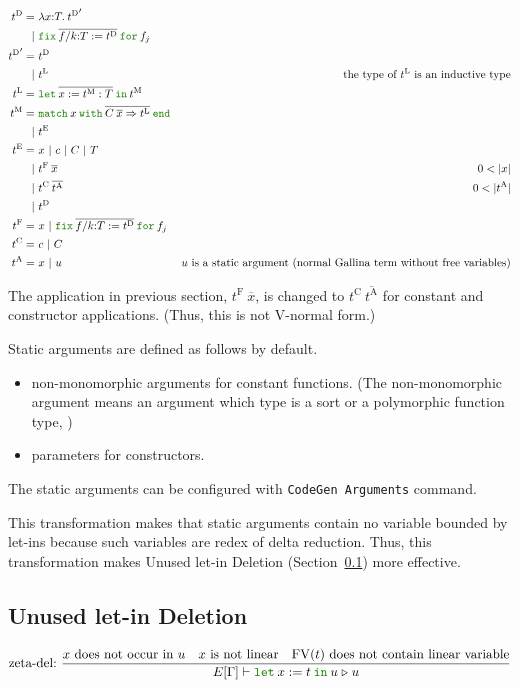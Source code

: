 \documentclass[a4paper,fleqn]{article}
\def\gallina{\textrm{Gallina}}
\newcommand{\kwlet}{\mbox{\color{mygreen}\ttfamily let}}
\newcommand{\kwin}{\mbox{\color{mygreen}\ttfamily in}}
\newcommand{\kwmatch}{\mbox{\color{mygreen}\ttfamily match}}
\newcommand{\kwwith}{\mbox{\color{mygreen}\ttfamily with}}
\newcommand{\kwend}{\mbox{\color{mygreen}\ttfamily end}}
\newcommand{\kwfix}{\mbox{\color{mygreen}\ttfamily fix}}
\newcommand{\kwfor}{\mbox{\color{mygreen}\ttfamily for}}
\newcommand{\lamT}[3]{\lambda #1\mathord{:}#2.\:#3}
\newcommand{\letin}[3]{\kwlet\:#1:=#2\:\kwin\:#3}
\newcommand{\letinM}[3]{\kwlet\:\rep{#1:=#2}\:\kwin\:#3}
\newcommand{\omatch}[2]{\kwmatch\:#1\:\kwwith\:{#2}\:\kwend}
\newcommand{\ofix}[2]{\kwfix\:{#1}\:\kwfor\:{#2}}
\DeclareMathOperator{\FV}{FV}
\newcommand{\tD}{{t^\mathrm{D}}}
\newcommand{\tE}{{t^\mathrm{E}}}
\newcommand{\tL}{{t^\mathrm{L}}}
\newcommand{\tM}{{t^\mathrm{M}}}
\newcommand{\tF}{{t^\mathrm{F}}}
\newcommand{\tC}{{t^\mathrm{C}}}
\newcommand{\tA}{{t^\mathrm{A}}}
\newcommand{\secref}[1]{Section~\ref{#1}}
\newcommand{\reltri}{\mathrel{\triangleright}}
\newcommand{\rep}[1]{\overline{#1}}
\begin{document}
\begin{align*}
  \tD =&\ \lamT{x}{T}{\tD'} \\
      |&\ \ofix{\overline{f/k{:}T:=\tD}}{f_j} \\
  \tD' =&\ \tD \\
       |&\ \tL & \text{the type of $\tL$ is an inductive type} \\
  \tL =&\ \letinM{x}{\tM:T}{\tM} \\
  \tM =&\ \omatch{x}{\overline{C\:\overline{x}\Rightarrow \tL}} \\
      |&\ \tE \\
  \tE =&\ x ~|~ c ~|~ C ~|~ T \\
    |&\ \tF\:\rep{x} & \text{$0 < |x|$} \\
    |&\ \tC\:\rep{\tA} & \text{$0 < |\tA|$} \\
    |&\ \tD \\
  \tF =&\ x ~|~ \ofix{\overline{f/k{:}T:=\tD}}{f_j} \\
  \tC =&\ c ~|~ C \\
  \tA =&\ x ~|~ u & \text{$u$ is a static argument (normal \gallina{} term without free variables)}
\end{align*}

The application in previous section, $\tF\:\rep{x}$, is changed to $\tC\:\rep{\tA}$ for constant and constructor applications.
(Thus, this is not V-normal form.)

Static arguments are defined as follows by default.
\begin{itemize}
  \item non-monomorphic arguments for constant functions.
    (The non-monomorphic argument means an argument which type is a sort or a polymorphic function type,  )
  \item parameters for constructors.
\end{itemize}
The static arguments can be configured with \lstinline!CodeGen Arguments! command.

This transformation makes that static arguments contain no variable bounded by let-ins
because such variables are redex of delta reduction.
Thus, this transformation makes Unused let-in Deletion (\secref{sec:let-in-deletion}) more effective.

\subsection{Unused let-in Deletion}\label{sec:let-in-deletion}

\begin{gather*}
  \text{zeta-del:}~
    \dfrac{
      \text{$x$ does not occur in $u$} \quad \text{$x$ is not linear} \quad \text{$\FV(t)$ does not contain linear variable}
    }{E[\Gamma] \vdash \letin{x}{t}{u}
                       \reltri
                       u
    }
\end{gather*}
\end{document}
